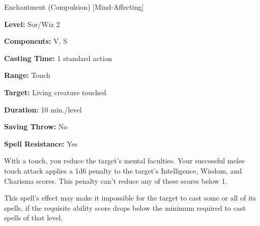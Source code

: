 
Enchantment (Compulsion) [Mind-Affecting]

\textbf{Level:} Sor/Wiz 2

\textbf{Components:} V, S

\textbf{Casting Time:} 1 standard action

\textbf{Range:} Touch

\textbf{Target:} Living creature touched

\textbf{Duration:} 10 min./level

\textbf{Saving Throw:} No

\textbf{Spell Resistance:} Yes

With a touch, you reduce the target's mental faculties. Your successful melee touch 
attack applies a 1d6 penalty to the target's Intelligence, Wisdom, and Charisma 
scores. This penalty can't reduce any of these scores below 1.

This spell's effect may make it impossible for the target to cast some or all of 
its spells, if the requisite ability score drops below the minimum required to 
cast spells of that level.

